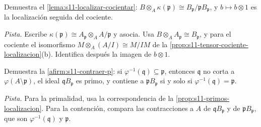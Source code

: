 \begin{ejer}
\label{ejer:s11-localizar-cocientar}
Demuestra el \cref{lema:s11-localizar-cocientar}: \(B\otimes_A\kappa(\mathfrak p)\cong B_{\mathfrak p}/\mathfrak pB_{\mathfrak p}\), y \(b\mapsto b\otimes1\) es la localización seguida del cociente.

\emph{Pista.} Escribe \(\kappa(\mathfrak p)\cong A_{\mathfrak p}\otimes_A A/\mathfrak p\) y asocia. Usa \(B\otimes_AA_{\mathfrak p}\cong B_{\mathfrak p}\), y para el cociente el isomorfismo \(M\otimes_A(A/I)\cong M/IM\) de la \cref{prop:s11-tensor-cociente-localizacion}(b). Identifica después la imagen de \(b\otimes1\).
\end{ejer}

\begin{ejer}
\label{ejer:s11-contraer-p}
Demuestra la \cref{afirm:s11-contraer-p}: si \(\varphi^{-1}(\mathfrak q)\subseteq\mathfrak p\), entonces \(\mathfrak q\) no corta a \(\varphi(A\setminus\mathfrak p)\), el ideal \(\mathfrak qB_{\mathfrak p}\) es primo, y contiene a \(\mathfrak pB_{\mathfrak p}\) si y solo si \(\varphi^{-1}(\mathfrak q)=\mathfrak p\).

\emph{Pista.} Para la primalidad, usa la correspondencia de la \cref{prop:s11-primos-localizacion}. Para la contención, compara las contracciones a \(A\) de \(\mathfrak qB_{\mathfrak p}\) y de \(\mathfrak pB_{\mathfrak p}\), que son \(\varphi^{-1}(\mathfrak q)\) y \(\mathfrak p\).
\end{ejer}
